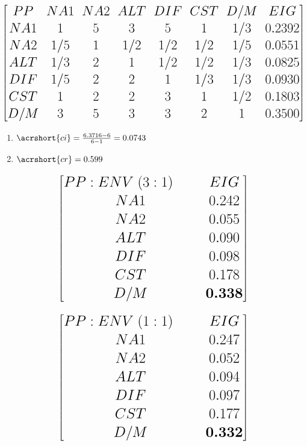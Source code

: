 \documentclass[aspectratio=1610,pdftex,dvipsnames,compress,xcolor={dvipsnames}]{beamer}
\newcommand{\acs}{\acrshort} %
\begin{document}
\begin{frame}{}
    \begin{equation}
        \LARGE
        \begin{bmatrix}
            PP &NA1 &NA2 &ALT &DIF &CST &D/M &EIG \\ 
            NA1 &1 &5 &3 &5 &1 &1/3 &0.2392 \\ 
            NA2 &1/5 &1 &1/2 &1/2 &1/2 &1/5 &0.0551 \\ 
            ALT &1/3 &2 &1 &1/2 &1/2 &1/3 &0.0825 \\ 
            DIF &1/5 &2 &2 &1 &1/3 &1/3 &0.0930 \\ 
            CST &1 &2 &2 &3 &1 &1/2 &0.1803 \\ 
            D/M &3 &5 &3 &3 &2 &1 &0.3500 
        \end{bmatrix} 
    \end{equation}

    \begin{enumerate}[series=outerlist,topsep=0pt,itemsep=5pt,leftmargin=*,label=(\arabic*)]
        \item[]$\acs{ci} = \frac{6.3716-6}{6-1} = 0.0743$
        \item[]$\acs{cr} = 0.599$
    \end{enumerate}
\end{frame}


\begin{frame}{}
    \begin{equation}
        \LARGE
        \begin{bmatrix}
            PP:ENV \; (3:1) \;\;\;\;\;\; &EIG \\ 
            NA1 &0.242 \\ 
            NA2 &0.055 \\ 
            ALT &0.090 \\ 
            DIF &0.098 \\ 
            CST &0.178 \\ 
            D/M &\textbf{0.338}
        \end{bmatrix} 
    \end{equation}
\end{frame}


\begin{frame}{}
    \begin{equation}
        \LARGE
        \begin{bmatrix}
            PP:ENV \; (1:1) \;\;\;\;\;\; &EIG \\ 
            NA1 &0.247 \\ 
            NA2 &0.052 \\ 
            ALT &0.094 \\ 
            DIF &0.097 \\ 
            CST &0.177 \\ 
            D/M &\textbf{0.332} 
        \end{bmatrix} 
    \end{equation}
\end{frame}
\end{document}
